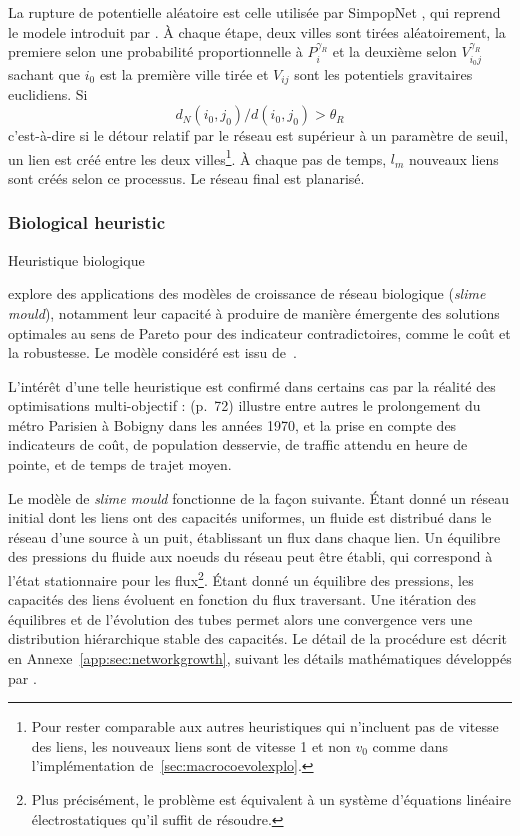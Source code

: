 La rupture de potentielle aléatoire est celle utilisée par SimpopNet \cite{schmitt2014modelisation}, qui reprend le modele introduit par \cite{blumenfeld2010network}. À chaque étape, deux villes sont tirées aléatoirement, la premiere selon une probabilité proportionnelle à $P_i^{\gamma_R}$ et la deuxième selon $V_{i_0j}^{\gamma_R}$ sachant que $i_0$ est la première ville tirée et $V_{ij}$ sont les potentiels gravitaires euclidiens. Si
\[
d_N(i_0,j_0) / d(i_0,j_0) > \theta_R
\]
c'est-à-dire si le détour relatif par le réseau est supérieur à un paramètre de seuil, un lien est créé entre les deux villes\footnote{Pour rester comparable aux autres heuristiques qui n'incluent pas de vitesse des liens, les nouveaux liens sont de vitesse 1 et non $v_0$ comme dans l'implémentation de~\ref{sec:macrocoevolexplo}.}. À chaque pas de temps, $l_m$ nouveaux liens sont créés selon ce processus. Le réseau final est planarisé.







\subsubsection{Biological heuristic}{Heuristique biologique}

\cite{raimbault2015labex} explore des applications des modèles de croissance de réseau biologique (\emph{slime mould}), notamment leur capacité à produire de manière émergente des solutions optimales au sens de Pareto pour des indicateur contradictoires, comme le coût et la robustesse. Le modèle considéré est issu de~\cite{tero2010rules}.

L'intérêt d'une telle heuristique est confirmé dans certains cas par la réalité des optimisations multi-objectif : \cite{padeiro:tel-00438092} (p.~72) illustre entre autres le prolongement du métro Parisien à Bobigny dans les années 1970, et la prise en compte des indicateurs de coût, de population desservie, de traffic attendu en heure de pointe, et de temps de trajet moyen.

Le modèle de \emph{slime mould} fonctionne de la façon suivante. Étant donné un réseau initial dont les liens ont des capacités uniformes, un fluide est distribué dans le réseau d'une source à un puit, établissant un flux dans chaque lien. Un équilibre des pressions du fluide aux noeuds du réseau peut être établi, qui correspond à l'état stationnaire pour les flux\footnote{Plus précisément, le problème est équivalent à un système d'équations linéaire électrostatiques qu'il suffit de résoudre.}. Étant donné un équilibre des pressions, les capacités des liens évoluent en fonction du flux traversant. Une itération des équilibres et de l'évolution des tubes permet alors une convergence vers une distribution hiérarchique stable des capacités. Le détail de la procédure est décrit en Annexe~\ref{app:sec:networkgrowth}, suivant les détails mathématiques développés par \cite{tero2007mathematical}.


